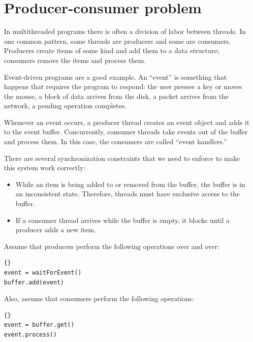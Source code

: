 \documentclass{book}
\begin{document}
\section{Producer-consumer problem}

In multithreaded programs there is often a division of labor between
threads.  In one common pattern, some threads are producers and some
are consumers.  Producers create items of some kind and add them to a
data structure; consumers remove the items and process them.

Event-driven programs are a good example.  An ``event'' is something
that happens that requires the program to respond: the user presses a
key or moves the mouse, a block of data arrives from the disk, a
packet arrives from the network, a pending operation completes.

Whenever an event occurs, a producer thread creates an event
object and adds it to the event buffer.  Concurrently, consumer
threads take events out of the buffer and process them.
In this case, the consumers are called ``event handlers.''

There are several synchronization constraints that we need to
enforce to make this system work correctly:

\begin{itemize}

\item While an item is being added to or removed from the buffer,
the buffer is in an inconsistent state.  Therefore, threads must
have exclusive access to the buffer.

\item If a consumer thread arrives while the buffer is empty, it
blocks until a producer adds a new item.

\end{itemize}

Assume that producers perform the following operations over and
over:

\begin{latin}
\begin{latin}
\begin{lstlisting}[title={Basic producer code}]{}
event = waitForEvent()
buffer.add(event)
\end{lstlisting}
\end{latin}
\end{latin}

Also, assume that consumers perform the following operations:

\begin{latin}
\begin{latin}
\begin{lstlisting}[title={Basic consumer code}]{}
event = buffer.get()
event.process()
\end{lstlisting}
\end{latin}
\end{latin}
\end{document}
